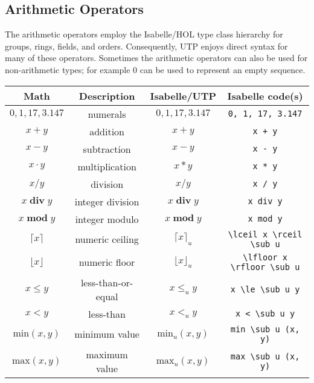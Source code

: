 \documentclass[11pt]{article}
\begin{document}
\newpage

\subsection{Arithmetic Operators}

The arithmetic operators employ the Isabelle/HOL type class hierarchy for groups, rings, fields, and
orders. Consequently, UTP enjoys direct syntax for many of these operators. Sometimes the arithmetic operators can also
be used for non-arithmetic types; for example $0$ can be used to represent an empty sequence.

\begin{center}
\begin{tabular}{|c|c|c|c|} \hline
  \textbf{Math}               & \textbf{Description}        & \textbf{Isabelle/UTP}       & \textbf{Isabelle code(s)} \\ \hline
  $0, 1, 17, 3.147$           & numerals                    & $0, 1, 17, 3.147$           & \verb|0, 1, 17, 3.147| \\
  $x + y$                     & addition                    & $x + y$                     & \verb|x + y| \\
  $x - y$                     & subtraction                 & $x - y$                     & \verb|x - y| \\
  $x \cdot y$                 & multiplication              & $x * y$                     & \verb|x * y| \\  
  $x / y$                     & division                    & $x / y$                     & \verb|x / y| \\
  $x \mathop{\textbf{div}} y$ & integer division            & $x \mathop{\textbf{div}} y$ & \verb|x div y| \\
  $x \mathop{\textbf{mod}} y$ & integer modulo              & $x \mathop{\textbf{mod}} y$ & \verb|x mod y| \\
  $\lceil x \rceil$           & numeric ceiling             & $\lceil x \rceil_u$         & \verb|\lceil x \rceil \sub u| \\
  $\lfloor x \rfloor$         & numeric floor               & $\lfloor x \rfloor_u$       & \verb|\lfloor x \rfloor \sub u| \\
  $x \le y$                   & less-than-or-equal          & $x \le_u y$                 & \verb|x \le \sub u y| \\
  $x < y$                     & less-than                   & $x <_u y$                   & \verb|x < \sub u y| \\
  $\textrm{min}(x, y)$        & minimum value               & $\textrm{min}_u(x, y)$      & \verb|min \sub u (x, y)| \\ 
  $\textrm{max}(x, y)$        & maximum value               & $\textrm{max}_u(x, y)$      & \verb|max \sub u (x, y)| \\ 
  \hline
\end{tabular}
\end{center}
\end{document}
